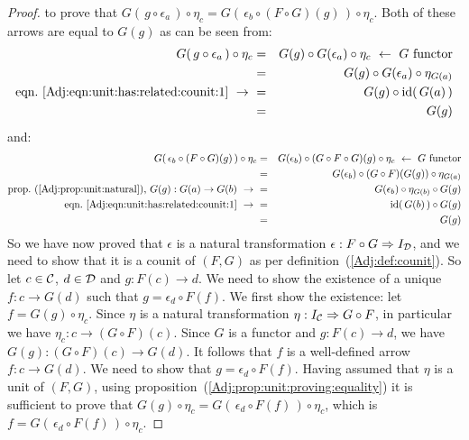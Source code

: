 \begin{proof}
    to prove that $G(\,g\circ\epsilon_{a}\,)\circ\eta_{c}=G(\,\epsilon_{b}
    \circ(F\circ G)(g)\,)\circ\eta_{c}$. Both of these arrows are equal to
    $G(g)$ as can be seen from:
        \begin{eqnarray*}G(\,g\circ\epsilon_{a}\,)\circ\eta_{c}
            &=&G(g)\circ G(\epsilon_{a})\circ\eta_{c}
            \ \leftarrow\ \mbox{$G$ functor}\\
            &=&G(g)\circ G(\epsilon_{a})\circ\eta_{G(a)}\\
            \mbox{eqn.~\ref{Adj:eqn:unit:has:related:counit:1}}\ \to\ 
            &=&G(g)\circ\id(\,G(a)\,)\\
            &=&G(g)
        \end{eqnarray*}
    and:
        \begin{eqnarray*}G(\,\epsilon_{b}\circ(F\circ G)(g)\,)\circ\eta_{c}
            &=&G(\epsilon_{b})\circ(G\circ F\circ G)(g)\circ\eta_{c}
            \ \leftarrow\ \mbox{$G$ functor}\\
            &=&G(\epsilon_{b})\circ(G\circ F)(G(g))\circ\eta_{G(a)}\\
            \mbox{prop.~(\ref{Adj:prop:unit:natural}), $G(g):G(a)\to G(b)$}\ \to\ 
            &=&G(\epsilon_{b})\circ\eta_{G(b)}\circ G(g)\\
            \mbox{eqn.~\ref{Adj:eqn:unit:has:related:counit:1}}\ \to\ 
            &=&\id(\,G(b)\,)\circ G(g)\\
            &=&G(g)
        \end{eqnarray*}
    So we have now proved that $\epsilon$ is a natural transformation
    $\epsilon:F\circ G\Rightarrow I_{\cal D}$, and we need to show that
    it is a counit of $(F,G)$ as per definition~(\ref{Adj:def:counit}).
    So let $c\in\mbox{$\cal C$}$, $d\in\mbox{$\cal D$}$ and $g:F(c)\to d$. We need to show
    the existence of a unique $f:c\to G(d)$ such that $g=\epsilon_{d}\circ F(f)$.
    We first show the existence: let $f=G(g)\circ\eta_{c}$. Since $\eta$
    is a natural transformation $\eta:I_{\cal C}\Rightarrow G\circ F$, in 
    particular we have $\eta_{c}:c\to (G\circ F)(c)$. Since $G$ is a functor
    and $g:F(c)\to d$, we have $G(g):(G\circ F)(c)\to G(d)$. It follows that
    $f$ is a well-defined arrow $f:c\to G(d)$. We need to show that
    $g=\epsilon_{d}\circ F(f)$. Having assumed that $\eta$ is a unit
    of $(F,G)$, using proposition~(\ref{Adj:prop:unit:proving:equality}) it
    is sufficient to prove that $G(g)\circ\eta_{c}=G(\,\epsilon_{d}\circ F(f)\,)
    \circ\eta_{c}$, which is $f=G(\,\epsilon_{d}\circ F(f)\,)\circ\eta_{c}$.

\end{proof}
